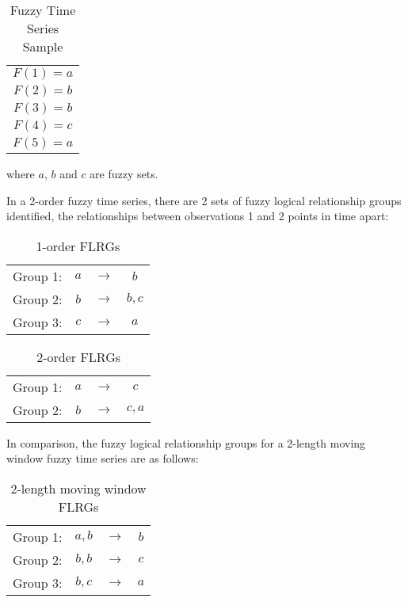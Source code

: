 \documentclass[12pt, oneside, a4paper]{article}
\theoremstyle{definition}
\begin{document}
\begin{table}[H]
	\center
	\begin{tabular}{ c }
	\hline
  	$F(1) = a$ \\
  	$F(2) = b$ \\
  	$F(3) = b$ \\
  	$F(4) = c$ \\
  	$F(5) = a$ \\
  	\hline
	\end{tabular}
	\caption{Fuzzy Time Series Sample}
\end{table}

where $a$, $b$ and $c$ are fuzzy sets.

In a 2-order fuzzy time series, there are 2 sets of fuzzy logical relationship groups identified, the relationships between observations 1 and 2 points in time apart:

\begin{multicols}{2}
\begin{table}[H]
	\center
	\begin{tabular}{ c c c c }
	\hline
  	Group 1: & $a$ &  $\rightarrow$ & $b$ \\
  	Group 2: & $b$ & $\rightarrow$ & $b, c$ \\
  	Group 3: & $c$ &  $\rightarrow$ & $a$ \\
  	\hline
	\end{tabular}
	\caption{1-order FLRGs}
\end{table}
\columnbreak
\begin{table}[H]
	\center
	\begin{tabular}{ c c c c }
	\hline
  	Group 1: & $a$ & $\rightarrow$ & $c$ \\
  	Group 2: & $b$ & $\rightarrow$ & $c, a$ \\
  	\hline
	\end{tabular}
	\caption{2-order FLRGs}
\end{table}
\end{multicols}

In comparison, the fuzzy logical relationship groups for a 2-length moving window fuzzy time series are as follows:

\begin{table}[H]
	\center
	\begin{tabular}{ c c c c }
	\hline
  	Group 1: & $a, b$ & $\rightarrow$ & $b$ \\
  	Group 2: & $b, b$ & $\rightarrow$ & $c$ \\
  	Group 3: & $b, c$ & $\rightarrow$ & $a$ \\
  	\hline
	\end{tabular}
	\caption{2-length moving window FLRGs}
\end{table}
\end{document}
